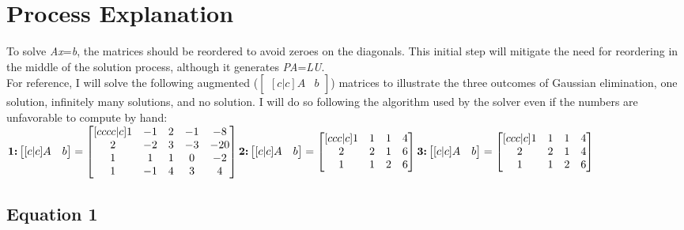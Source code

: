 \documentclass{article}
\begin{document}
\section{Process Explanation}
To solve \emph{Ax}=\emph{b}, the matrices should be reordered to avoid zeroes on the diagonals. This initial step will mitigate the need for reordering in the middle of the solution process, although it generates \emph{PA}=\emph{LU}.\\
For reference, I will solve the following augmented (\begin{math}\begin{bmatrix}[c|c]A&b\end{bmatrix}\end{math}) matrices to illustrate the three outcomes of Gaussian elimination, one solution, infinitely many solutions, and no solution. I will do so following the algorithm used by the solver even if the numbers are unfavorable to compute by hand:\\
\begin{math}
\text{\bf{1:}}\begin{bmatrix}[c|c]A&b\end{bmatrix} = \begin{bmatrix}[cccc|c]1&-1&2&-1&-8\\2&-2&3&-3&-20\\1&1&1&0&-2\\1&-1&4&3&4\end{bmatrix}\\\\
\text{\bf{2:}}\begin{bmatrix}[c|c]A&b\end{bmatrix} = \begin{bmatrix}[ccc|c]1&1&1&4\\2&2&1&6\\1&1&2&6\end{bmatrix}\\\\
\text{\bf{3:}}\begin{bmatrix}[c|c]A&b\end{bmatrix} =\begin{bmatrix}[ccc|c]1&1&1&4\\2&2&1&4\\1&1&2&6\end{bmatrix}
\end{math}

\subsection{Equation 1}
\end{document}
